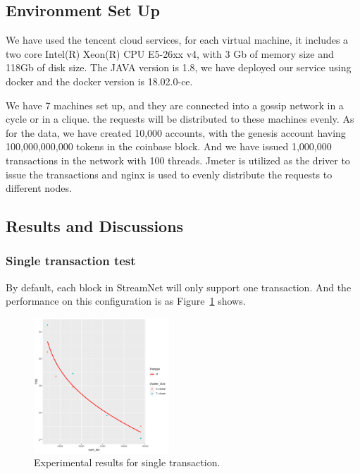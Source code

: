 \subsection {Environment Set Up}

We have used the tencent cloud services, for each virtual machine, it includes a two core Intel(R) Xeon(R) CPU E5-26xx v4, with 3 Gb of memory size and 118Gb of disk size. The JAVA version is 1.8, we have deployed our service using docker and the docker version is 18.02.0-ce.   

We have 7 machines set up, and they are connected into a gossip network in a cycle or in a clique. the requests will be distributed to these machines evenly.
As for the data, we have created 10,000 accounts, with the genesis account having 100,000,000,000 tokens in the coinbase block.
And we have issued 1,000,000 transactions in the network with 100 threads.
Jmeter is utilized as the driver to issue the transactions and nginx is used to evenly distribute the requests to different nodes.

\subsection {Results and Discussions}

\subsubsection {Single transaction test}
By default, each block in StreamNet will only support one transaction. And the performance on this configuration is as Figure~\ref{single_txn} shows.

\begin{figure}[!ht]
\begin{center}
\includegraphics[width=0.45\textwidth]{figures/single_txn.pdf}
    \caption{
        Experimental results for single transaction.
     }
\label{single_txn}
\end{center}
\end{figure}



